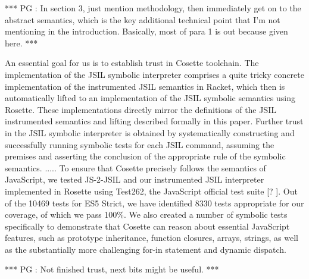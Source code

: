 \documentclass[sigconf, review]{acmart}
\newcommand{\polish}[1]{{\color{red}#1}}
\newcommand{\pgmaxinline}[1]{ {\color{purple} *** PG : #1 ***} }
\begin{document}
\pgmaxinline{In section 3, just mention methodology, then immediately get on to
  the abstract semantics, which is the key additional technical point
  that I'm not mentioning in the introduction. Basically, most of para
1 is out because given here.} 










An essential goal for us is to establish trust in Cosette toolchain.
The implementation of the JSIL symbolic interpreter comprises a quite
tricky concrete implementation of the instrumented JSIL semantics in
Racket, which then is automatically lifted to an implementation of the
JSIL symbolic semantics using Rosette. These implementations directly
mirror the definitions of the JSIL instrumented semantics and lifting
described formally in this paper.  Further trust in the JSIL symbolic
interpreter is obtained by systematically constructing and
successfully running symbolic tests for each JSIL command, assuming
the premises and asserting the conclusion of the appropriate rule of
the symbolic semantics. 
.....
To ensure that
Cosette precisely follows the semantics of JavaScript, we tested
JS-2-JSIL and our instrumented JSIL interpreter implemented in Rosette
using Test262, the JavaScript official test suite [? ]. Out of the
10469 tests for ES5 Strict, we have identified 8330 tests appropriate
for our coverage, of which we pass 100\%.  We also created a number of
symbolic tests specifically to demonstrate that Cosette can reason
about essential JavaScript features, such as prototype inheritance,
function closures, arrays, strings, as well as the substantially more
challenging for-in statement and dynamic dispatch.


\pgmaxinline{Not finished trust, next bits might be useful.} 

\end{document}

